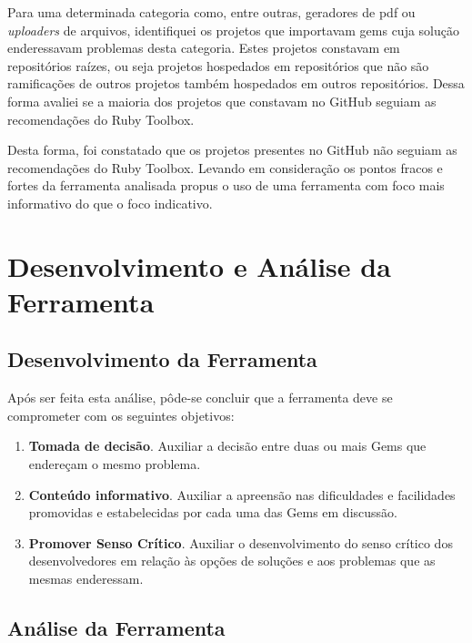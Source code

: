 Para uma determinada categoria como, entre outras, geradores de pdf ou \textit{uploaders} de arquivos, identifiquei os projetos que importavam gems cuja solução enderessavam problemas desta categoria. Estes projetos constavam em repositórios raízes, ou seja projetos hospedados em repositórios que não são ramificações de outros projetos também hospedados em outros repositórios. Dessa forma avaliei se a maioria dos projetos que constavam no GitHub seguiam as recomendações do Ruby Toolbox.

Desta forma, foi constatado que os projetos presentes no GitHub não seguiam as recomendações do Ruby Toolbox. Levando em consideração os pontos fracos e fortes da ferramenta analisada propus o uso de uma ferramenta com foco mais informativo do que o foco indicativo.

\section{Desenvolvimento e Análise da Ferramenta}

\subsection{Desenvolvimento da Ferramenta}

Após ser feita esta análise, pôde-se concluir que a ferramenta deve se comprometer com os seguintes objetivos:

\begin{enumerate}

  \item \textbf{Tomada de decisão}. Auxiliar a decisão entre duas ou mais Gems que endereçam o mesmo problema.
  
  \item \textbf{Conteúdo informativo}. Auxiliar a apreensão nas dificuldades e facilidades promovidas e estabelecidas por cada uma das Gems em discussão.
  
  \item \textbf{Promover Senso Crítico}. Auxiliar o desenvolvimento do senso crítico dos desenvolvedores em relação às opções de soluções e aos problemas que as mesmas enderessam.
  
\end{enumerate}

\subsection{Análise da Ferramenta}

